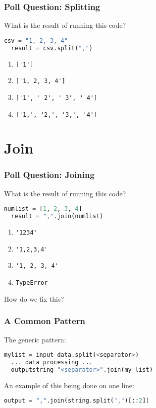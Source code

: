 \documentclass{beamer}
\begin{document}
%
%
\begin{frame}[fragile]
  \frametitle{Poll Question: Splitting}
  What is the result of running this code?
  \begin{lstlisting}[language=Python, autogobble]
  csv = "1, 2, 3, 4"
  result = csv.split(",")
  \end{lstlisting}
  \vfill
  \begin{enumerate}[A]
    \item \lstinline|['1']|
    \item \lstinline|['1, 2, 3, 4']|
    \item \lstinline|['1', ' 2', ' 3', ' 4']|
    \item \lstinline|['1,', '2,', '3,', '4']|
  \end{enumerate}
\end{frame}


\section{Join}

%
%
\begin{frame}[fragile]
  \frametitle{Poll Question: Joining}
  What is the result of running this code?
  \begin{lstlisting}[language=Python, autogobble]
  numlist = [1, 2, 3, 4]
  result = ",".join(numlist)
  \end{lstlisting}
  \vfill
  \begin{enumerate}[A]
    \item \lstinline|'1234'|
    \item \lstinline|'1,2,3,4'|
    \item \lstinline|'1, 2, 3, 4'|
    \item \lstinline|TypeError|
  \end{enumerate}
  \pause
  How do we fix this?
\end{frame}


%
%
\begin{frame}[fragile]
  \frametitle{A Common Pattern}
  The generic pattern:
  \begin{lstlisting}[language=Python, autogobble]
  mylist = input_data.split(<separator>)
  ... data processing ...
  outputstring "<separator>".join(my_list)
  \end{lstlisting}
  \vfill
  An example of this being done on one line:
  \begin{lstlisting}[language=Python, autogobble]
  output = ",".join(string.split(",")[::2])
  \end{lstlisting}
\end{frame}
\end{document}
